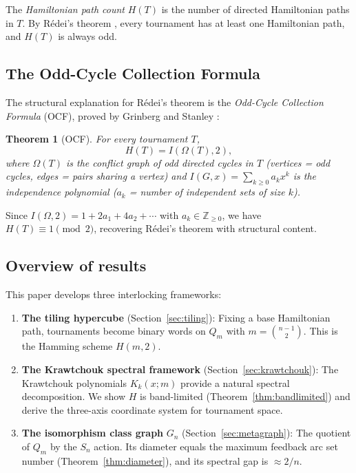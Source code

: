 \documentclass[11pt,a4paper]{article}
\newtheorem{theorem}{Theorem}[section]
\theoremstyle{definition}
\theoremstyle{remark}
\begin{document}
The \emph{Hamiltonian path count} $H(T)$ is the number of directed Hamiltonian paths in $T$. By R\'edei's theorem \cite{redei1934}, every tournament has at least one Hamiltonian path, and $H(T)$ is always odd.

\subsection{The Odd-Cycle Collection Formula}

The structural explanation for R\'edei's theorem is the \emph{Odd-Cycle Collection Formula} (OCF), proved by Grinberg and Stanley \cite{grinberg2024}:

\begin{theorem}[OCF]
\label{thm:ocf}
For every tournament $T$,
\[
H(T) = I(\Omega(T), 2),
\]
where $\Omega(T)$ is the conflict graph of odd directed cycles in $T$ (vertices = odd cycles, edges = pairs sharing a vertex) and $I(G, x) = \sum_{k \geq 0} a_k x^k$ is the independence polynomial ($a_k$ = number of independent sets of size $k$).
\end{theorem}

Since $I(\Omega, 2) = 1 + 2a_1 + 4a_2 + \cdots$ with $a_k \in \mathbb{Z}_{\geq 0}$, we have $H(T) \equiv 1 \pmod{2}$, recovering R\'edei's theorem with structural content.

\subsection{Overview of results}

This paper develops three interlocking frameworks:

\begin{enumerate}[label=(\roman*)]
\item \textbf{The tiling hypercube} (Section~\ref{sec:tiling}): Fixing a base Hamiltonian path, tournaments become binary words on $Q_m$ with $m = \binom{n-1}{2}$. This is the Hamming scheme $H(m, 2)$.

\item \textbf{The Krawtchouk spectral framework} (Section~\ref{sec:krawtchouk}): The Krawtchouk polynomials $K_k(x; m)$ provide a natural spectral decomposition. We show $H$ is band-limited (Theorem~\ref{thm:bandlimited}) and derive the three-axis coordinate system for tournament space.

\item \textbf{The isomorphism class graph} $G_n$ (Section~\ref{sec:metagraph}): The quotient of $Q_m$ by the $S_n$ action. Its diameter equals the maximum feedback arc set number (Theorem~\ref{thm:diameter}), and its spectral gap is $\approx 2/n$.
\end{enumerate}
\end{document}

